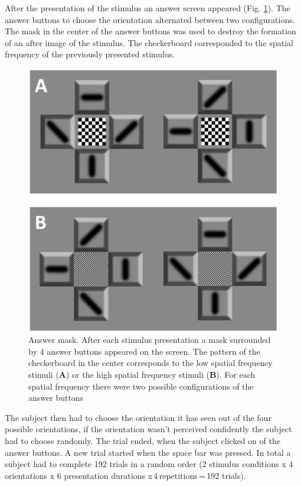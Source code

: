 After the presentation of the stimulus an answer screen appeared (Fig. \ref{fig:answer_mask}). The answer buttons to choose the orientation alternated between two configurations. The mask in the center of the answer buttons was used to destroy the formation of an after image of the stimulus. The checkerboard corresponded to the spatial frequency of the previously presented stimulus. 
\begin{figure}[H]
    \centering
    \includegraphics[scale = 0.5]{Figures/answer_mask.png}
    \caption[Answer mask]{Answer mask. After each stimulus presentation a mask surrounded by 4 answer buttons appeared on the screen.  The pattern of the checkerboard in the center corresponds to the low spatial frequency stimuli (\textbf{A}) or the high spatial frequency stimuli (\textbf{B}). For each spatial frequency there were two possible configurations of the answer buttons}
    \label{fig:answer_mask}
\end{figure}
\vspace{5mm}
The subject then had to choose the orientation it has seen out of the four possible orientations, if the orientation wasn't perceived confidently the subject had to choose randomly. The trial ended, when the subject clicked on of the answer buttons. A new trial started when the space bar was pressed. In total a subject had to complete 192 trials in a random order (2 stimulus conditions x 4 orientations x 6 presentation durations x\,4\,repetitions\,=\,192 trials).

